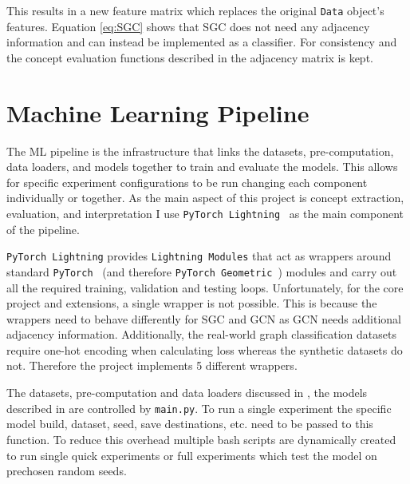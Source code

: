This results in a new feature matrix which replaces the original \texttt{Data} object's features.
Equation \ref{eq:SGC} shows that SGC does not need any adjacency information and can instead be implemented as a classifier.
For consistency and the concept evaluation functions described in  the adjacency matrix is kept.

\section{Machine Learning Pipeline}
\label{sec:pipeline}

The ML pipeline is the infrastructure that links the datasets, pre-computation, data loaders, and models together to train and evaluate the models.
This allows for specific experiment configurations to be run changing each component individually or together.
As the main aspect of this project is concept extraction, evaluation, and interpretation I use \texttt{PyTorch Lightning}~\cite{Falcon_PyTorch_Lightning_2019} as the main component of the pipeline.

\texttt{PyTorch Lightning} provides \texttt{Lightning Modules} that act as wrappers around standard \texttt{PyTorch}~\cite{paszke2019pytorch} (and therefore \texttt{PyTorch Geometric}~\cite{Fey/Lenssen/2019}) modules and carry out all the required training, validation and testing loops.
Unfortunately, for the core project and extensions, a single wrapper is not possible.
This is because the wrappers need to behave differently for SGC and GCN as GCN needs additional adjacency information.
Additionally, the real-world graph classification datasets require one-hot encoding when calculating loss whereas the synthetic datasets do not.
Therefore the project implements 5 different wrappers.

The datasets, pre-computation and data loaders discussed in , the models described in  are controlled by \texttt{main.py}.
To run a single experiment the specific model build, dataset, seed, save destinations, etc. need to be passed to this function.
To reduce this overhead multiple bash scripts are dynamically created to run single quick experiments or full experiments which test the model on prechosen random seeds.

